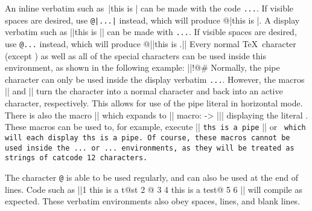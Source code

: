 An inline verbatim such as\ |this is \inline| can be made with the code {\tt\pipe...\pipe}. If visible spaces are desired, use 
{\tt @\string|...\string|} instead, which will produce @|this is \inline|. A display verbatim such as
||this is \display||
can be made with {\tt\pipe\pipe...\pipe\pipe}. If visible spaces are desired, use {\tt @\pipe\pipe...\pipe\pipe} instead, which will produce
@||this is \display.||
Every normal \TeX\ character (except {\tt\pipe}) as well as all of the special characters can be used inside this environment, as shown in the following example:
||!$@$#%
Normally, the pipe character {\tt\pipe} can only be used inside the display verbatim {\tt\pipe\pipe...\pipe\pipe}. However, the macros |\makepipeother| and |\makepipeactive| turn the character {\tt\pipe} into a normal character and back into an active character, respectively. This allows for use of the pipe literal in horizontal mode.
There is also the macro |\pipe| which expands to
|| macro: -> \bgroup\string|\egroup ||
displaying the literal {\tt\pipe}. These macros can be used to, for example, execute
|| {\tt th\pipe{}s is a pipe} ||
or
\begindisplay
\tt
\makepipeother
\string\makepipeother{}\string\makepipeactive
\makepipeactive
\enddisplay
which will each display {\tt th\pipe{}s is a pipe}. Of course, these macros cannot be used inside the {\tt\pipe...\pipe} or {\tt\pipe\pipe...\pipe\pipe} environments, as they will be treated as strings of catcode 12 characters.

The character {\tt @} is able to be used regularly, and can also be used at the end of lines. Code such as
||1 this is a t@st
2 @
3
4 this is a test@
5
6 \bye||
will compile as expected. These verbatim environments also obey spaces, lines, and blank lines.

\bye